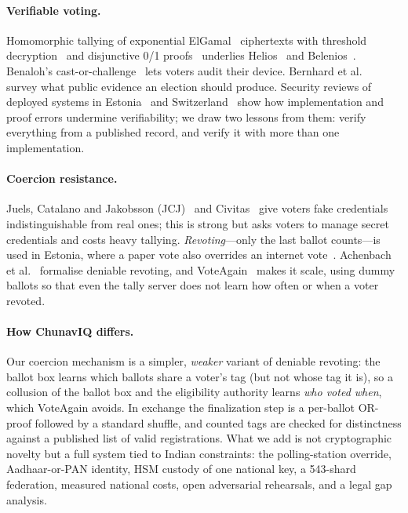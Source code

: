 \documentclass[runningheads]{llncs}
\begin{document}
\paragraph{Verifiable voting.} Homomorphic tallying of exponential ElGamal~\cite{elgamal1985} ciphertexts with threshold decryption~\cite{pedersen1991,feldman1987} and disjunctive 0/1 proofs~\cite{cds1994,cgs1997} underlies Helios~\cite{adida2008helios} and Belenios~\cite{belenios2019}. Benaloh's cast-or-challenge~\cite{benaloh2007} lets voters audit their device. Bernhard et al.~\cite{bernhard2017} survey what public evidence an election should produce. Security reviews of deployed systems in Estonia~\cite{springall2014} and Switzerland~\cite{haines2020} show how implementation and proof errors undermine verifiability; we draw two lessons from them: verify everything from a published record, and verify it with more than one implementation.

\paragraph{Coercion resistance.} Juels, Catalano and Jakobsson (JCJ)~\cite{jcj2005} and Civitas~\cite{civitas2008} give voters fake credentials indistinguishable from real ones; this is strong but asks voters to manage secret credentials and costs heavy tallying. \emph{Revoting}---only the last ballot counts---is used in Estonia, where a paper vote also overrides an internet vote~\cite{springall2014}. Achenbach et al.~\cite{achenbach2015} formalise deniable revoting, and VoteAgain~\cite{voteagain2020} makes it scale, using dummy ballots so that even the tally server does not learn how often or when a voter revoted.

\paragraph{How ChunavIQ differs.} Our coercion mechanism is a simpler, \emph{weaker} variant of deniable revoting: the ballot box learns which ballots share a voter's tag (but not whose tag it is), so a collusion of the ballot box and the eligibility authority learns \emph{who voted when}, which VoteAgain avoids. In exchange the finalization step is a per-ballot OR-proof followed by a standard shuffle, and counted tags are checked for distinctness against a published list of valid registrations. What we add is not cryptographic novelty but a full system tied to Indian constraints: the polling-station override, Aadhaar-or-PAN identity, HSM custody of one national key, a 543-shard federation, measured national costs, open adversarial rehearsals, and a legal gap analysis.
\end{document}

